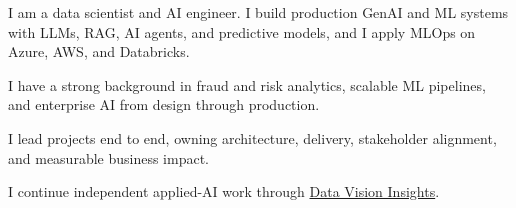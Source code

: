 
{\small\color{cvtext}%
\noindent I am a data scientist and AI engineer. I build production GenAI and ML systems with LLMs, RAG, AI agents, and predictive models, and I apply MLOps on Azure, AWS, and Databricks.\par
\vspace{0.14em}%
\noindent I have a strong background in fraud and risk analytics, scalable ML pipelines, and enterprise AI from design through production.\par
\vspace{0.14em}%
\noindent I lead projects end to end, owning architecture, delivery, stakeholder alignment, and measurable business impact.\par
\vspace{0.14em}%
\noindent I continue independent applied-AI work through \href{https://datavisioninsights.com/}{Data Vision Insights}.\par
}
